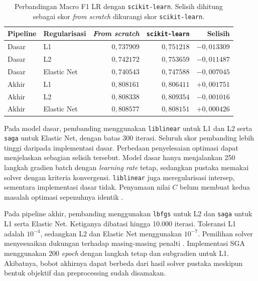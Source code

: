 \begin{table}[htbp]
    \centering
    \caption{Perbandingan Macro F1 LR dengan \texttt{scikit-learn}. Selisih dihitung sebagai skor \textit{from scratch} dikurangi skor \texttt{scikit-learn}.}
    \label{tab:lr-sklearn}
    \begin{tabular}{llrrr}
        \toprule
        Pipeline & Regularisasi & \textit{From scratch} & \texttt{scikit-learn} & Selisih       \\
        \midrule
        Dasar    & L1           & $0{,}737909$          & $0{,}751218$          & $-0{,}013309$ \\
        Dasar    & L2           & $0{,}742172$          & $0{,}753659$          & $-0{,}011487$ \\
        Dasar    & Elastic Net  & $0{,}740543$          & $0{,}747588$          & $-0{,}007045$ \\
        \midrule
        Akhir    & L1           & $0{,}808161$          & $0{,}806411$          & $+0{,}001751$ \\
        Akhir    & L2           & $0{,}808338$          & $0{,}809354$          & $-0{,}001016$ \\
        Akhir    & Elastic Net  & $0{,}808577$          & $0{,}808151$          & $+0{,}000426$ \\
        \bottomrule
    \end{tabular}
\end{table}

Pada model dasar, pembanding menggunakan \texttt{liblinear} untuk L1 dan L2 serta \texttt{saga} untuk Elastic Net, dengan batas 300 iterasi. Seluruh skor pembanding lebih tinggi daripada implementasi dasar. Perbedaan penyelesaian optimasi dapat menjelaskan sebagian selisih tersebut. Model dasar hanya menjalankan 250 langkah gradien batch dengan \textit{learning rate} tetap, sedangkan pustaka memakai solver dengan kriteria konvergensi. \texttt{liblinear} juga meregularisasi intersep, sementara implementasi dasar tidak. Penyamaan nilai $C$ belum membuat kedua masalah optimasi sepenuhnya identik \cite{scikitlearn_logistic_api}.

Pada pipeline akhir, pembanding menggunakan \texttt{lbfgs} untuk L2 dan \texttt{saga} untuk L1 serta Elastic Net. Ketiganya dibatasi hingga 10.000 iterasi. Toleransi L1 adalah $10^{-4}$, sedangkan L2 dan Elastic Net menggunakan $10^{-7}$. Pemilihan solver menyesuaikan dukungan terhadap masing-masing penalti \cite{scikitlearn_logistic_api}. Implementasi SGA menggunakan 200 \textit{epoch} dengan langkah tetap dan subgradien untuk L1. Akibatnya, bobot akhirnya dapat berbeda dari hasil solver pustaka meskipun bentuk objektif dan preprocessing sudah disamakan.

